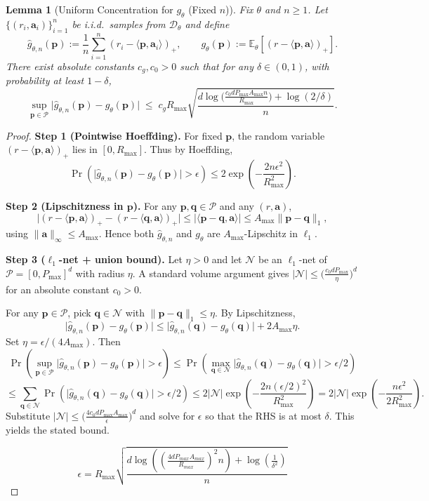 \documentclass[11pt]{article}
\newtheorem{lemma}[theorem]{Lemma}
\newcommand{\ba}{\mathbf{a}}
\newcommand{\bp}{\mathbf{p}}
\newcommand{\E}{\mathbb{E}}
\newcommand{\cP}{\mathcal{P}}
\newcommand{\cD}{\mathcal{D}}
\begin{document}
\begin{lemma}[Uniform Concentration for $g_\theta$ (Fixed $n$)]
\label{lem:conc-g}
Fix $\theta$ and $n\ge 1$. Let $\{(r_i,\ba_i)\}_{i=1}^n$ be i.i.d.\ samples from $\cD_\theta$ and define
\[
\widehat g_{\theta,n}(\bp):=\frac1n\sum_{i=1}^n (r_i-\langle \bp,\ba_i\rangle)_+,\qquad
g_\theta(\bp):=\E_\theta[(r-\langle \bp,\ba\rangle)_+].
\]
There exist absolute constants $c_g,c_0>0$ such that for any $\delta\in(0,1)$, with probability at least
$1-\delta$,
\[
\sup_{\bp\in\cP}\big|\widehat g_{\theta,n}(\bp)-g_\theta(\bp)\big|
\;\le\;
c_g R_{\max}\sqrt{\frac{d\log\!\Big(\frac{c_0 d P_{\max} A_{\max} n}{R_{\max}}\Big)+\log(2/\delta)}{n}}.
\]
\end{lemma}

\begin{proof}
\textbf{Step 1 (Pointwise Hoeffding).}
For fixed $\bp$, the random variable $(r-\langle \bp,\ba\rangle)_+$ lies in $[0,R_{\max}]$.
Thus by Hoeffding,
\[
\Pr\!\left(\big|\widehat g_{\theta,n}(\bp)-g_\theta(\bp)\big|>\epsilon\right)
\le 2\exp\!\left(-\frac{2n\epsilon^2}{R_{\max}^2}\right).
\]

\textbf{Step 2 (Lipschitzness in $\bp$).}
For any $\bp,\boldsymbol{q}\in\cP$ and any $(r,\ba)$,
\[
\big|(r-\langle \bp,\ba\rangle)_+-(r-\langle \boldsymbol{q},\ba\rangle)_+\big|
\le |\langle \bp-\boldsymbol{q},\ba\rangle|
\le A_{\max}\|\bp-\boldsymbol{q}\|_1,
\]
using $\|\ba\|_\infty\le A_{\max}$. Hence both $\widehat g_{\theta,n}$ and $g_\theta$ are
$A_{\max}$-Lipschitz in $\ell_1$.

\textbf{Step 3 ($\ell_1$-net + union bound).}
Let $\eta>0$ and let $\mathcal N$ be an $\ell_1$-net of $\cP=[0,P_{\max}]^d$ with radius $\eta$.
A standard volume argument gives $|\mathcal N|\le \big(\frac{c_0 d P_{\max}}{\eta}\big)^d$
for an absolute constant $c_0>0$.

For any $\bp\in\cP$, pick $\boldsymbol{q}\in\mathcal N$ with $\|\bp-\boldsymbol{q}\|_1\le \eta$. By Lipschitzness,
\[
\big|\widehat g_{\theta,n}(\bp)-g_\theta(\bp)\big|
\le \big|\widehat g_{\theta,n}(\boldsymbol{q})-g_\theta(\boldsymbol{q})\big| + 2A_{\max}\eta.
\]
Set $\eta=\epsilon/(4A_{\max})$. Then
\[
\Pr\!\left(\sup_{\bp\in\cP}\big|\widehat g_{\theta,n}(\bp)-g_\theta(\bp)\big|>\epsilon\right)
\le
\Pr\!\left(\max_{\boldsymbol{q}\in\mathcal N}\big|\widehat g_{\theta,n}(\boldsymbol{q})-g_\theta(\boldsymbol{q})\big|>\epsilon/2\right)
\]
\[
\le
\sum_{\boldsymbol{q}\in\mathcal N}\Pr\!\left(\big|\widehat g_{\theta,n}(\boldsymbol{q})-g_\theta(\boldsymbol{q})\big|>\epsilon/2\right)
\le
2|\mathcal N|\exp\!\left(-\frac{2n(\epsilon/2)^2}{R_{\max}^2}\right)
=
2|\mathcal N|\exp\!\left(-\frac{n\epsilon^2}{2R_{\max}^2}\right).
\]
Substitute $|\mathcal N|\le \big(\frac{4c_0 d P_{\max}A_{\max}}{\epsilon}\big)^d$ and solve for $\epsilon$
so that the RHS is at most $\delta$. This yields the stated bound.

\begin{equation*}
    \epsilon = R_{\max}\sqrt{\frac{d\log\left(\left(\frac{4d P_{max} A_{max}}{ R_{max}}\right)^2n\right)+\log\left(\frac{1}{\delta^2}\right)}{n}}
\end{equation*}

\end{proof}
\end{document}

